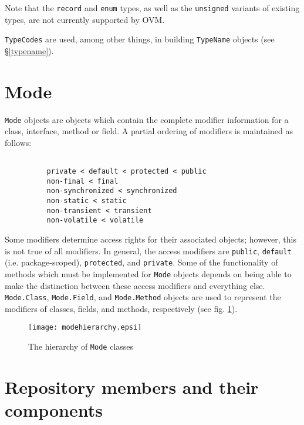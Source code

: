 \documentclass{report}
\begin{document}
Note that the \texttt{record} and \texttt{enum} types, as well as the
\texttt{unsigned} variants of existing types, are not currently supported
by OVM.

\texttt{TypeCodes} are used, among other things, in building \texttt{TypeName} 
objects (see \S \ref{typename}).

\newpage

\section{Mode}\label{mode}

\texttt{Mode} objects are objects which contain the complete modifier 
information for a class, interface, method or field. A partial ordering of 
modifiers is maintained as follows:

\begin{verbatim}

          private < default < protected < public
          non-final < final 
          non-synchronized < synchronized
          non-static < static
          non-transient < transient
          non-volatile < volatile

\end{verbatim}

Some modifiers determine access rights for their associated objects; however,
this is not true of all modifiers. In general, the access modifiers are 
\texttt{public}, \texttt{default} (i.e. package-scoped), \texttt{protected}, 
and \texttt{private}. Some of the functionality of methods which must be 
implemented for \texttt{Mode} objects depends on being able to make the 
distinction between these access modifiers and everything else.
\texttt{Mode.Class}, \texttt{Mode.Field}, and \texttt{Mode.Meth\-od} objects
are used to represent the modifiers of classes, fields, and methods, 
respectively (see fig. \ref{mode_graphic}).

\begin{figure}[htb]
\begin{center}
\texttt{[image: modehierarchy.epsi]}
\caption{The hierarchy of \texttt{Mode} classes}
\label{mode_graphic}
\end{center}
\end{figure}

\section{Repository members and their components}\label{member}
\end{document}
